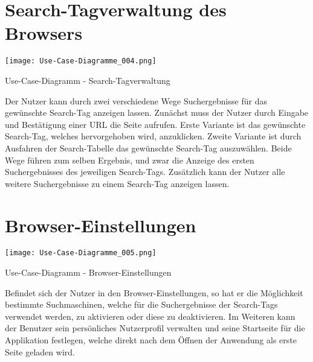 \section{Search-Tagverwaltung des Browsers}

\texttt{[image: Use-Case-Diagramme\_004.png]}
	\caption{Use-Case-Diagramm - Search-Tagverwaltung}
	\label{fig:Search-Tagverwaltung}

Der Nutzer kann durch zwei verschiedene Wege Suchergebnisse für das gewünschte Search-Tag anzeigen lassen. Zunächst muss der Nutzer durch Eingabe und Bestätigung einer URL die Seite aufrufen. Erste Variante ist das gewünschte Search-Tag, welches hervorgehoben wird, anzuklicken. Zweite Variante ist durch Ausfahren der Search-Tabelle das gewünschte Search-Tag auszuwählen. Beide Wege führen zum selben Ergebnis, und zwar die Anzeige des ersten Suchergebnisses des jeweiligen Search-Tags. Zusätzlich kann der Nutzer alle weitere Suchergebnisse zu einem Search-Tag anzeigen lassen.

\section{Browser-Einstellungen}

\texttt{[image: Use-Case-Diagramme\_005.png]}
	\caption{Use-Case-Diagramm - Browser-Einstellungen}
	\label{fig:Browser-Einstellungen}

Befindet sich der Nutzer in den Browser-Einstellungen, so hat er die Möglichkeit bestimmte Suchmaschinen, welche für die Suchergebnisse der Search-Tags verwendet werden, zu aktivieren oder diese zu deaktivieren. Im Weiteren kann der Benutzer sein persönliches Nutzerprofil verwalten und seine Startseite für die Applikation festlegen, welche direkt nach dem Öffnen der Anwendung als erste Seite geladen wird.
